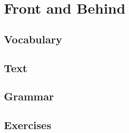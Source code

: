 \chapter{Front and Behind}
\section*{Vocabulary}
\section*{Text}
\section*{Grammar}
\section*{Exercises}
